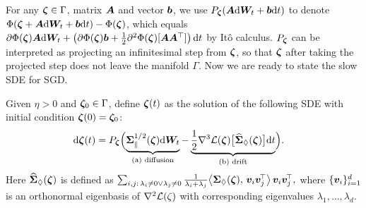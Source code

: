 For any ${\bm{\zeta}} \in \Gamma$, matrix ${\bm{A}}$ and vector ${\bm{b}}$, we use $P_{{\bm{\zeta}}}({\bm{A}} \mathrm{d} {\bm{W}}_t + {\bm{b}} \mathrm{d} t)$ to denote $\Phi({\bm{\zeta}} + {\bm{A}} \mathrm{d} {\bm{W}}_t + {\bm{b}} \mathrm{d} t) - \Phi({\bm{\zeta}})$, which equals $\partial \Phi({\bm{\zeta}}) {\bm{A}} \mathrm{d} {\bm{W}}_t + \left(\partial
    \Phi({\bm{\zeta}}) {\bm{b}} + \frac{1}{2}\partial^2 \Phi({\bm{\zeta}})[{\bm{A}} {\bm{A}}^\top]\right)
    \mathrm{d} t$ by Itô calculus.
 $P_{{\bm{\zeta}}}$ can be interpreted as projecting an infinitesimal step from ${\bm{\zeta}}$, so that ${\bm{\zeta}}$
after taking the projected step does not leave the manifold $\Gamma$.
Now we are ready to state the slow SDE for SGD.
\begin{definition}
Given $\eta>0$ and ${\bm{\zeta}}_0\in\Gamma$, define ${\bm{\zeta}}(t)$ as the solution of the following SDE with initial condition ${\bm{\zeta}}(0)={\bm{\zeta}}_0$:
\begin{align}
\mathrm{d}{\bm{\zeta}}(t)
&= P_{{\bm{\zeta}}}\Bigl(
  \underbrace{{\bm{\Sigma}}_{\parallel
  }^{1/2}({\bm{\zeta}})\mathrm{d}{\bm{W}}_t}_{\text{(a) diffusion}}
  -\underbrace{\frac{1}{2}\nabla^3 \mathcal{L}({\bm{\zeta}})\bigl[\widehat{{\bm{\Sigma}}}_{\Diamond}({\bm{\zeta}})\bigr]\mathrm{d}t}_{\text{(b) drift}}
\Bigr).
\label{eq:slow-sde-sgd}
\end{align}
Here $\widehat{{\bm{\Sigma}}}_{\Diamond}({\bm{\zeta}})$ is defined as
$
\sum_{i,j:\,\lambda_i\neq0\lor\lambda_j\neq0}
    \frac{1}{\lambda_i+\lambda_j}
    \bigl\langle {\bm{\Sigma}}_\Diamond({\bm{\zeta}}),\,{\bm{v}}_i {\bm{v}}_j^{\!\top}\bigr\rangle\,
    {\bm{v}}_i {\bm{v}}_j^{\!\top},
$
where $\{{\bm{v}}_i\}_{i=1}^d$ is an orthonormal eigenbasis of $\nabla^2\mathcal{L}(\zeta)$ with corresponding eigenvalues $\lambda_1,\dots,\lambda_d$. 
\end{definition}

